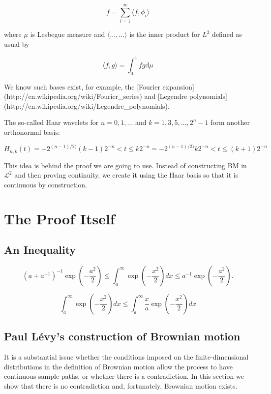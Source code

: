 \documentclass{article}
\begin{document}
$$
f = \sum_{i=1}^\infty \langle f, \phi_i\rangle
$$

where $\mu$ is Lesbegue measure and $\langle\ldots,\ldots\rangle$ is
the inner product for $L^2$ defined as usual by

$$
\langle f, g\rangle = \int_0^1 fg\mathrm{d}\mu
$$

We know such bases exist, for example, the [Fourier
expansion](http://en.wikipedia.org/wiki/Fourier_series) and [Legendre
polynomials](http://en.wikipedia.org/wiki/Legendre_polynomials).


The so-called Haar wavelets for $n = 0, 1, \ldots$ and $k = 1, 3, 5, \ldots, 2^n - 1$ form another orthonormal basis:

$$
H_{n,k}(t) = +2^{(n-1)/2)} (k - 1)2^{-n} < t \le k2^{-n}
           = -2^{(n-1)/2)} k2^{-n}       < t \le (k + 1)2^{-n}
$$

This idea is behind the proof we are going to use. Instead of
constructing BM in ${\mathcal{L}}^2$ and then proving continuity, we
create it using the Haar basis so that it is continuous by
construction.

\section{The Proof Itself}

\subsection{An Inequality}

$$
\left(a+a^{-1}\right)^{-1} \exp \left(-\frac{a^2}{2}\right) \leq \int_a^{\infty} \exp \left(-\frac{x^2}{2}\right) d x \leq a^{-1} \exp \left(-\frac{a^2}{2}\right) .
$$

$$
\int_a^{\infty} \exp \left(-\frac{x^2}{2}\right) d x \leq \int_a^{\infty} \frac{x}{a} \exp \left(-\frac{x^2}{2}\right) d x
$$

\subsection{Paul Lévy's construction of Brownian motion}

It is a substantial issue whether the conditions imposed on the finite-dimensional distributions in the definition of Brownian motion allow the process to have continuous sample paths, or whether there is a contradiction. In this section we show that there is no contradiction and, fortunately, Brownian motion exists.
\end{document}
